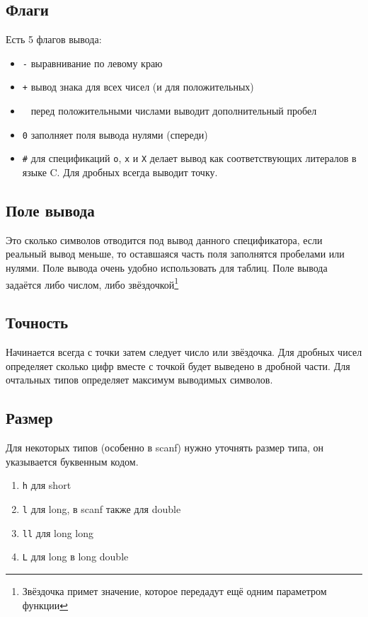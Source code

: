 \documentclass[12pt]{article}
\begin{document}
\subsection{Флаги}
Есть 5 флагов вывода:
\begin{itemize}
 \item \verb|-| выравнивание по левому краю
 \item \verb|+| вывод знака для всех чисел (и для положительных)
 \item \verb| | перед положительными числами выводит дополнительный пробел
 \item \verb|0| заполняет поля вывода нулями (спереди)
 \item \verb|#| для спецификаций \verb|o|, \verb|x| и \verb|X| делает вывод как соответствующих литералов в языке 
C. Для дробных всегда выводит точку.
\end{itemize}

\subsection{Поле вывода}
Это сколько символов отводится под вывод данного спецификатора, если реальный вывод меньше, то оставшаяся часть поля 
заполнятся пробелами или нулями. Поле вывода очень удобно использовать для таблиц. Поле вывода задаётся либо числом, 
либо звёздочкой\footnote{Звёздочка примет значение, которое передадут ещё одним параметром функции}

\subsection{Точность}
Начинается всегда с точки затем следует число или звёздочка. Для дробных чисел определяет сколько цифр вместе с точкой 
будет выведено в дробной части. Для очтальных типов определяет максимум выводимых символов.

\subsection{Размер}
Для некоторых типов (особенно в scanf) нужно уточнять размер типа, он указывается буквенным кодом.

\begin{enumerate}
 \item \verb|h| для short
 \item \verb|l| для long,  в scanf также для double
 \item \verb|ll| для long long
 \item \verb|L| для long в long double
\end{enumerate}
\end{document}
